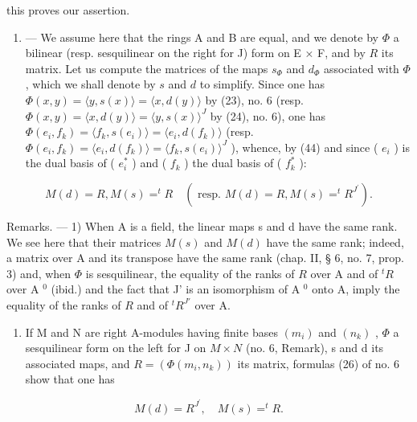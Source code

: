 this proves our assertion.

\begin{enumerate}
\def\labelenumi{\Roman{enumi}.}
\setcounter{enumi}{3}
\tightlist
\item
  --- We assume here that the rings A and B are equal, and we denote by \(\Phi\) a bilinear (resp. sesquilinear on the right for J) form on E × F, and by \(R\) its matrix. Let us compute the matrices of the maps \(s_{\Phi}\) and \(d_{\Phi}\) associated with \(\Phi\) , which we shall denote by \(s\) and \(d\) to simplify. Since one has \(\Phi(x, y) = \langle y, s(x) \rangle = \langle x, d(y) \rangle\) by (23), no. 6 (resp. \(\Phi(x, y) = \langle x, d(y) \rangle = \langle y, s(x) \rangle^{J}\) by (24), no. 6), one has \(\Phi(e_i, f_k) = \langle f_k, s(e_i) \rangle = \langle e_i, d(f_k) \rangle\) (resp. \(\Phi(e_i, f_k) = \langle e_i, d(f_k) \rangle = \langle f_k, s(e_i) \rangle^{J}\) ), whence, by (44) and since ( \(e_i\) ) is the dual basis of ( \(e_i^*\) ) and ( \(f_k\) ) the dual basis of ( \(f_k^*\) ):
\end{enumerate}

\[
M (d) = R,   M (s) = ^ {t} R \quad (\text { resp. }   M (d) = R,   M (s) = ^ {t} R ^ {J ^ {\prime}}).\tag{49}
\]

Remarks. --- 1) When A is a field, the linear maps s and d have the same rank. We see here that their matrices \(M(s)\) and \(M(d)\) have the same rank; indeed, a matrix over A and its transpose have the same rank (chap. II, § 6, no. 7, prop. 3) and, when \(\Phi\) is sesquilinear, the equality of the ranks of \(R\) over A and of \(^tR\) over A \(^0\) (ibid.) and the fact that J' is an isomorphism of A \(^0\) onto A, imply the equality of the ranks of \(R\) and of \(^tR^{J'}\) over A.

\begin{enumerate}
\def\labelenumi{\arabic{enumi})}
\setcounter{enumi}{1}
\tightlist
\item
  If M and N are right A-modules having finite bases \((m_{i})\) and \((n_{k})\) , \(\Phi\) a sesquilinear form on the left for J on \(M \times N\) (no. 6, Remark), s and d its associated maps, and \(R = (\Phi(m_{i}, n_{k}))\) its matrix, formulas (26) of no. 6 show that one has
\end{enumerate}

\[
M (d) = R ^ {J ^ {\prime}}, \quad M (s) = ^ {t} R.
\]

